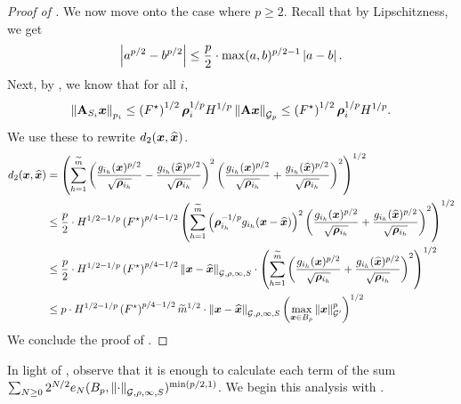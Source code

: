 \documentclass[11pt]{article}
\numberwithin{equation}{section}
\begin{document}
\begin{proof}[Proof of ]
We now move onto the case where $p \ge 2$. Recall that by Lipschitzness, we get
\begin{align*}
    \left\lvert a^{p/2}-b^{p/2} \right\rvert \le \frac{p}{2} \cdot \max(a,b)^{p/2-1}\left\lvert a-b \right\rvert.
\end{align*}
Next, by , we know that for all $i$, 
\begin{align*}
    \left\lVert \mathbf{A}_{S_i}\bm{x} \right\rVert_{p_i} \le \left(F^{\star}\right)^{1/2}\bm{\rho}_i^{1/p}H^{1/p}\left\lVert \mathbf{A}\bm{x} \right\rVert_{\mathcal{G}_{p}} \le \left(F^{\star}\right)^{1/2}\bm{\rho}_i^{1/p}H^{1/p}.
\end{align*}
We use these to rewrite $d_2(\bm{x},\widehat{\bm{x}})$.
\begin{align*}
    d_2(\bm{x}, \widehat{\bm{x}}) &= \left(\sum_{h=1}^{\widetilde{m}} \left(\frac{g_{i_h}(\bm{x})^{p/2}}{\sqrt{\bm{\rho}_{i_h}}} - \frac{g_{i_h}(\widehat{\bm{x}})^{p/2}}{\sqrt{\bm{\rho}_{i_h}}}\right)^2\left(\frac{g_{i_h}(\bm{x})^{p/2}}{\sqrt{\bm{\rho}_{i_h}}} + \frac{g_{i_h}(\widehat{\bm{x}})^{p/2}}{\sqrt{\bm{\rho}_{i_h}}}\right)^2\right)^{1/2} \\
    &\le \frac{p}{2}\cdot H^{1/2-1/p}\left(F^{\star}\right)^{p/4-1/2}\left(\sum_{h=1}^{\widetilde{m}} \left(\bm{\rho}_{i_h}^{-1/p}g_{i_h}(\bm{x}-\widehat{\bm{x}})\right)^2\left(\frac{g_{i_h}(\bm{x})^{p/2}}{\sqrt{\bm{\rho}_{i_h}}} + \frac{g_{i_h}(\widehat{\bm{x}})^{p/2}}{\sqrt{\bm{\rho}_{i_h}}}\right)^2\right)^{1/2} \\
    &\le \frac{p}{2}\cdot H^{1/2-1/p}\left(F^{\star}\right)^{p/4-1/2}\left\lVert \bm{x}-\widehat{\bm{x}} \right\rVert_{\mathcal{G},\rho,\infty, S}\cdot\left(\sum_{h=1}^{\widetilde{m}} \left(\frac{g_{i_h}(\bm{x})^{p/2}}{\sqrt{\bm{\rho}_{i_h}}} + \frac{g_{i_h}(\widehat{\bm{x}})^{p/2}}{\sqrt{\bm{\rho}_{i_h}}}\right)^2\right)^{1/2} \\
    &\le p \cdot H^{1/2-1/p}\left(F^{\star}\right)^{p/4-1/2}{\widetilde{m}}^{1/2} \cdot \left\lVert \bm{x}-\widehat{\bm{x}} \right\rVert_{\mathcal{G},\rho,\infty, S}\left(\max_{\bm{x} \in B_{p}}\left\lVert \bm{x} \right\rVert_{\mathcal{G}'}^p\right)^{1/2}
\end{align*}
We conclude the proof of .
\end{proof}

In light of , observe that it is enough to calculate each term of the sum $\sum_{N \ge 0} 2^{N/2}e_N(B_p, \left\lVert \cdot \right\rVert_{\mathcal{G},\rho,\infty, S})^{\min(p/2,1)}$. We begin this analysis with .
\end{document}
